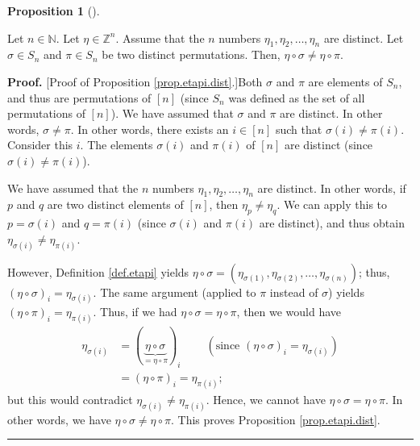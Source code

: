 \documentclass[numbers=enddot,12pt,final,onecolumn,notitlepage,english]{scrartcl}%
\theoremstyle{definition}
\newtheorem{prop}[theo]{Proposition}
\newenvironment{proposition}[1][]
{\begin{prop}[#1]\begin{leftbar}}
{\end{leftbar}\end{prop}}
\newenvironment{proof}[1][Proof]{\noindent\textbf{#1.} }{\ \rule{0.5em}{0.5em}}
\newenvironment{verlong}{}{}
\begin{document}
\begin{proposition}
\label{prop.etapi.dist}Let $n\in\mathbb{N}$. Let $\eta\in\mathbb{Z}^{n}$.
Assume that the $n$ numbers $\eta_{1},\eta_{2},\ldots,\eta_{n}$ are distinct.
Let $\sigma\in S_{n}$ and $\pi\in S_{n}$ be two distinct permutations. Then,
$\eta\circ\sigma\neq\eta\circ\pi$.
\end{proposition}

\begin{verlong}
\begin{proof}
[Proof of Proposition \ref{prop.etapi.dist}.]Both $\sigma$ and $\pi$ are
elements of $S_{n}$, and thus are permutations of $\left[  n\right]  $ (since
$S_{n}$ was defined as the set of all permutations of $\left[  n\right]  $).
We have assumed that $\sigma$ and $\pi$ are distinct. In other words,
$\sigma\neq\pi$. In other words, there exists an $i\in\left[  n\right]  $ such
that $\sigma\left(  i\right)  \neq\pi\left(  i\right)  $. Consider this $i$.
The elements $\sigma\left(  i\right)  $ and $\pi\left(  i\right)  $ of
$\left[  n\right]  $ are distinct (since $\sigma\left(  i\right)  \neq
\pi\left(  i\right)  $).

We have assumed that the $n$ numbers $\eta_{1},\eta_{2},\ldots,\eta_{n}$ are
distinct. In other words, if $p$ and $q$ are two distinct elements of $\left[
n\right]  $, then $\eta_{p}\neq\eta_{q}$. We can apply this to $p=\sigma
\left(  i\right)  $ and $q=\pi\left(  i\right)  $ (since $\sigma\left(
i\right)  $ and $\pi\left(  i\right)  $ are distinct), and thus obtain
$\eta_{\sigma\left(  i\right)  }\neq\eta_{\pi\left(  i\right)  }$.

However, Definition \ref{def.etapi} yields $\eta\circ\sigma=\left(
\eta_{\sigma\left(  1\right)  },\eta_{\sigma\left(  2\right)  },\ldots
,\eta_{\sigma\left(  n\right)  }\right)  $; thus, $\left(  \eta\circ
\sigma\right)  _{i}=\eta_{\sigma\left(  i\right)  }$. The same argument
(applied to $\pi$ instead of $\sigma$) yields $\left(  \eta\circ\pi\right)
_{i}=\eta_{\pi\left(  i\right)  }$. Thus, if we had $\eta\circ\sigma=\eta
\circ\pi$, then we would have%
\begin{align*}
\eta_{\sigma\left(  i\right)  }  &  =\left(  \underbrace{\eta\circ\sigma
}_{=\eta\circ\pi}\right)  _{i}\ \ \ \ \ \ \ \ \ \ \left(  \text{since }\left(
\eta\circ\sigma\right)  _{i}=\eta_{\sigma\left(  i\right)  }\right) \\
&  =\left(  \eta\circ\pi\right)  _{i}=\eta_{\pi\left(  i\right)  };
\end{align*}
but this would contradict $\eta_{\sigma\left(  i\right)  }\neq\eta_{\pi\left(
i\right)  }$. Hence, we cannot have $\eta\circ\sigma=\eta\circ\pi$. In other
words, we have $\eta\circ\sigma\neq\eta\circ\pi$. This proves Proposition
\ref{prop.etapi.dist}.
\end{proof}
\end{verlong}
\end{document}
